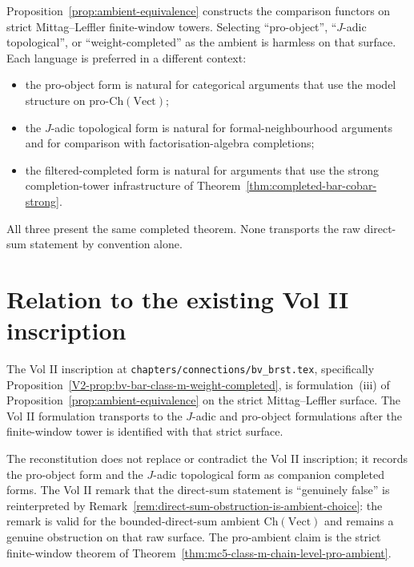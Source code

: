 \begin{remark}
\label{rem:ambient-convention}
Proposition~\textup{\ref{prop:ambient-equivalence}} constructs the
comparison functors on strict Mittag--Leffler finite-window towers.
Selecting ``pro-object'', ``$J$-adic topological'', or
``weight-completed'' as the ambient is harmless on that surface. Each
language is preferred in a different context:
\begin{itemize}
\item the pro-object form is natural for categorical arguments that
use the model structure on $\mathrm{pro}\text{-}\mathrm{Ch}(\mathrm{Vect})$;
\item the $J$-adic topological form is natural for formal-neighbourhood
arguments and for comparison with factorisation-algebra completions;
\item the filtered-completed form is natural for arguments that use
the strong completion-tower infrastructure of
Theorem~\textup{\ref{thm:completed-bar-cobar-strong}}.
\end{itemize}
All three present the same completed theorem. None transports the raw
direct-sum statement by convention alone.
\end{remark}

\section{Relation to the existing Vol II inscription}
\label{sec:mc5-relation-to-vol2}

The Vol II inscription at
\texttt{chapters/connections/bv\_brst.tex}, specifically
Proposition~\textup{\ref{V2-prop:bv-bar-class-m-weight-completed}}, is
formulation~\textup{(iii)} of
Proposition~\textup{\ref{prop:ambient-equivalence}} on the strict
Mittag--Leffler surface. The Vol II formulation transports to the
$J$-adic and pro-object formulations after the finite-window tower is
identified with that strict surface.

The reconstitution does not replace or contradict the Vol II inscription;
it records the pro-object form and the $J$-adic topological form as
companion completed forms. The Vol II remark that the direct-sum
statement is ``genuinely false'' is reinterpreted by
Remark~\ref{rem:direct-sum-obstruction-is-ambient-choice}: the remark
is valid for the bounded-direct-sum ambient $\mathrm{Ch}(\mathrm{Vect})$
and remains a genuine obstruction on that raw surface. The pro-ambient
claim is the strict finite-window theorem of
Theorem~\ref{thm:mc5-class-m-chain-level-pro-ambient}.

